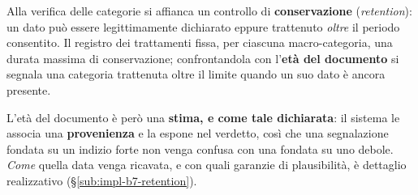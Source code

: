 
Alla verifica delle categorie si affianca un controllo di \textbf{conservazione} (\textit{retention}): un dato può essere legittimamente dichiarato eppure trattenuto \emph{oltre} il periodo consentito. Il registro dei trattamenti fissa, per ciascuna macro-categoria, una durata massima di conservazione; confrontandola con l'\textbf{età del documento} si segnala una categoria trattenuta oltre il limite quando un suo dato è ancora presente.

L'età del documento è però una \textbf{stima, e come tale dichiarata}: il sistema le associa una \textbf{provenienza} e la espone nel verdetto, così che una segnalazione fondata su un indizio forte non venga confusa con una fondata su uno debole. \emph{Come} quella data venga ricavata, e con quali garanzie di plausibilità, è dettaglio realizzativo (§\ref{sub:impl-b7-retention}).

